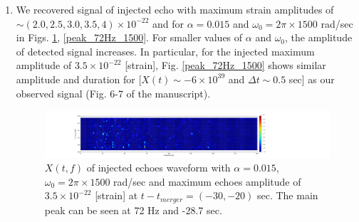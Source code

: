 \documentclass[a4paper,11pt]{article}
\begin{document}
\begin{enumerate}
\item We recovered signal of injected echo with maximum strain amplitudes of $\sim (2.0, 2.5, 3.0, 3.5, 4) \times 10^{-22}$ and for $\alpha = 0.015$ and $\omega_{0}=2\pi \times 1500$ rad/sec in Figs. \ref{spectrogram_color_00}, \ref{peak_72Hz_1500}. For smaller values of  $\alpha$ and $\omega_{0}$, the amplitude of detected signal increases. In particular, for the injected maximum amplitude of $3.5 \times 10^{-22}$ [strain], Fig. \ref{peak_72Hz_1500} shows similar amplitude and duration for [$X(t) \sim -6 \times 10^{39}$ and $\Delta t \sim 0.5$ sec] as our observed signal (Fig. 6-7 of the manuscript).  
\begin{figure}[t]
\centering
    \includegraphics[width=1.0\textwidth]{spectrogram_color_alpha_0015.pdf}
 \caption{$X(t,f)$ of injected echoes waveform with $\alpha=0.015$, $\omega_{0}=2\pi \times 1500$ rad/sec and maximum echoes amplitude of $3.5 \times 10^{-22}$ [strain] at $t-t_{merger}=(-30,-20)$ sec. The main peak can be seen at 72 Hz and -28.7 sec. }
 \label{spectrogram_color_00}
\end{figure}



\end{enumerate}
\end{document}

